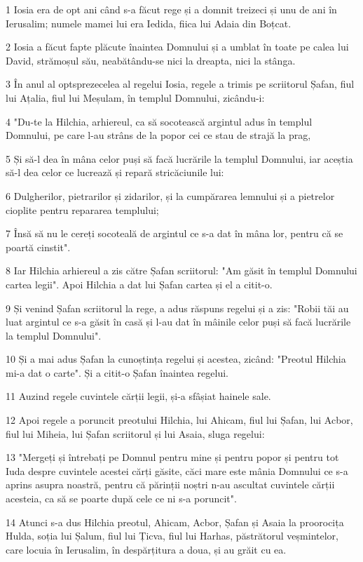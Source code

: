\par 1 Iosia era de opt ani când s-a făcut rege și a domnit treizeci și unu de ani în Ierusalim; numele mamei lui era Iedida, fiica lui Adaia din Boțcat.
\par 2 Iosia a făcut fapte plăcute înaintea Domnului și a umblat în toate pe calea lui David, strămoșul său, neabătându-se nici la dreapta, nici la stânga.
\par 3 În anul al optsprezecelea al regelui Iosia, regele a trimis pe scriitorul Șafan, fiul lui Ațalia, fiul lui Meșulam, în templul Domnului, zicându-i:
\par 4 "Du-te la Hilchia, arhiereul, ca să socotească argintul adus în templul Domnului, pe care l-au strâns de la popor cei ce stau de strajă la prag,
\par 5 Și să-l dea în mâna celor puși să facă lucrările la templul Domnului, iar aceștia să-l dea celor ce lucrează și repară stricăciunile lui:
\par 6 Dulgherilor, pietrarilor și zidarilor, și la cumpărarea lemnului și a pietrelor cioplite pentru repararea templului;
\par 7 Însă să nu le cereți socoteală de argintul ce s-a dat în mâna lor, pentru că se poartă cinstit".
\par 8 Iar Hilchia arhiereul a zis către Șafan scriitorul: "Am găsit în templul Domnului cartea legii". Apoi Hilchia a dat lui Șafan cartea și el a citit-o.
\par 9 Și venind Șafan scriitorul la rege, a adus răspuns regelui și a zis: "Robii tăi au luat argintul ce s-a găsit în casă și l-au dat în mâinile celor puși să facă lucrările la templul Domnului".
\par 10 Și a mai adus Șafan la cunoștința regelui și acestea, zicând: "Preotul Hilchia mi-a dat o carte". Și a citit-o Șafan înaintea regelui.
\par 11 Auzind regele cuvintele cărții legii, și-a sfâșiat hainele sale.
\par 12 Apoi regele a poruncit preotului Hilchia, lui Ahicam, fiul lui Șafan, lui Acbor, fiul lui Miheia, lui Șafan scriitorul și lui Asaia, sluga regelui:
\par 13 "Mergeți și întrebați pe Domnul pentru mine și pentru popor și pentru tot Iuda despre cuvintele acestei cărți găsite, căci mare este mânia Domnului ce s-a aprins asupra noastră, pentru că părinții noștri n-au ascultat cuvintele cărții acesteia, ca să se poarte după cele ce ni s-a poruncit".
\par 14 Atunci s-a dus Hilchia preotul, Ahicam, Acbor, Șafan și Asaia la proorocița Hulda, soția lui Șalum, fiul lui Țicva, fiul lui Harhas, păstrătorul veșmintelor, care locuia în Ierusalim, în despărțitura a doua, și au grăit cu ea.
